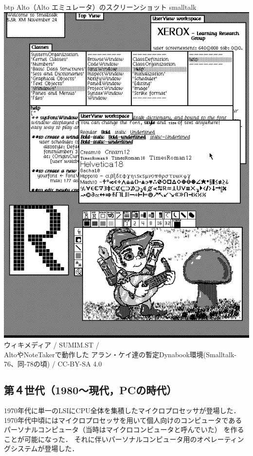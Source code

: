\begin{itemize}
\begin{myfig}{btp}
{Alto（Alto エミュレータ）のスクリーンショット}
{smalltalk}
\includegraphics[scale=0.5]{Photo/Smalltalk-76.png}\\
{\small
ウィキメディア /
SUMIM.ST /\\
AltoやNoteTakerで動作した
アラン・ケイ達の暫定Dynabook環境(Smalltalk-76、同-78の頃) /
CC-BY-SA 4.0
}
\end{myfig}

\end{itemize}

\subsection{第４世代（1980〜現代，PCの時代）}

1970年代に単一のLSIにCPU全体を集積したマイクロプロセッサが登場した．
1970年代中頃にはマイクロプロセッサを用いて個人向けのコンピュータである
パーソナルコンピュータ（当時はマイクロコンピュータと呼んでいた）
を作ることが可能になった．
それに伴いパーソナルコンピュータ用のオペレーティングシステムが登場した．


